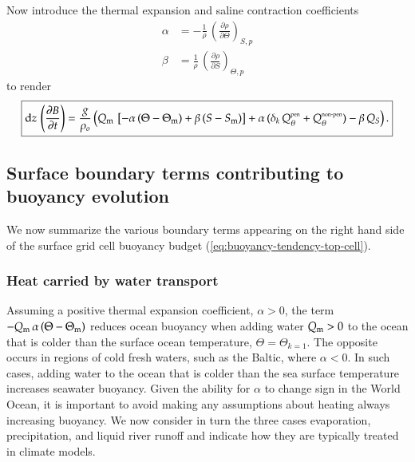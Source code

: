 Now introduce the thermal expansion and saline contraction
coefficients
\begin{align}
 \alpha &= -\frac{1}{\rho} \, \left( \frac{\partial \rho}{\partial \Theta} \right)_{S,p} 
\label{eq:alpha-kpp}
\\
\beta &= \frac{1}{\rho} \, \left( \frac{\partial \rho}{\partial S} \right)_{\Theta,p}
\label{eq:beta-kpp}
\end{align}
to render 
\begin{equation}
\boxed{
 \mathrm{d}z \, \left( \frac{\partial B}{\partial t} \right)
  =
 \frac{g}{\rho_{o}} \left( 
 Q_{\mbox{\scriptsize m}} \, \left[ -\alpha \, (\Theta - \Theta_{\mbox{\scriptsize m}}) +  \beta \, (S - S_{\mbox{\scriptsize m}}) \right]
 + \alpha \, ( \delta_{k} \, Q_{\theta}^{\mbox{\tiny pen}} + Q_{\theta}^{\mbox{\tiny non-pen}} )
 - \beta \, Q_{S} \right). 
\label{eq:buoyancy-tendency-top-cell}
}
\end{equation}


\subsection{Surface boundary terms contributing to buoyancy evolution}

We now summarize the various boundary terms appearing on the right
hand side of the surface grid cell buoyancy budget
(\ref{eq:buoyancy-tendency-top-cell}).


\subsubsection{Heat carried by water transport}

Assuming a positive thermal expansion coefficient, $\alpha > 0$, the
term $-Q_{\mbox{\scriptsize m}} \, \alpha \, (\Theta - \Theta_{\mbox{\scriptsize m}})$ reduces ocean buoyancy
when adding water $Q_{\mbox{\scriptsize m}} > 0$ to the ocean that is colder than the
surface ocean temperature, $\Theta = \Theta_{k=1}$.  The opposite
occurs in regions of cold fresh waters, such as the Baltic, where
$\alpha < 0$.  In such cases, adding water to the ocean that is colder
than the sea surface temperature increases seawater buoyancy.  Given
the ability for $\alpha$ to change sign in the World Ocean, it is
important to avoid making any assumptions about heating always
increasing buoyancy.  We now consider in turn the three cases
evaporation, precipitation, and liquid river runoff and indicate how
they are typically treated in climate models.

